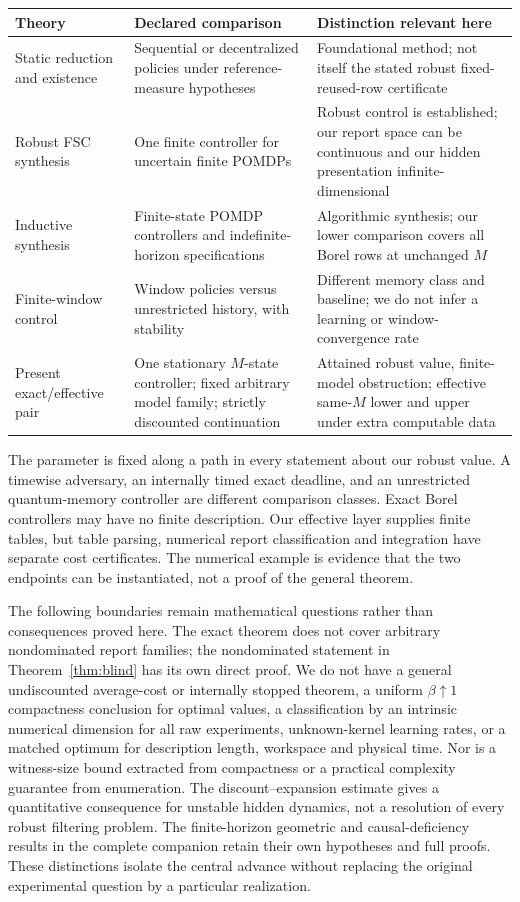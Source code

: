 \begin{center}\small
\begin{tabular}{p{.20\linewidth}p{.34\linewidth}p{.37\linewidth}}
\toprule
Theory & Declared comparison & Distinction relevant here\\\midrule
Static reduction and existence \cite{Witsenhausen,Yuksel} & Sequential or decentralized policies under reference-measure hypotheses & Foundational method; not itself the stated robust fixed-reused-row certificate\\[3pt]
Robust FSC synthesis \cite{Cubuktepe} & One finite controller for uncertain finite POMDPs & Robust control is established; our report space can be continuous and our hidden presentation infinite-dimensional\\[3pt]
Inductive synthesis \cite{Andriushchenko} & Finite-state POMDP controllers and indefinite-horizon specifications & Algorithmic synthesis; our lower comparison covers all Borel rows at unchanged $M$\\[3pt]
Finite-window control \cite{Kara} & Window policies versus unrestricted history, with stability & Different memory class and baseline; we do not infer a learning or window-convergence rate\\[3pt]
Present exact/effective pair & One stationary $M$-state controller; fixed arbitrary model family; strictly discounted continuation & Attained robust value, finite-model obstruction; effective same-$M$ lower and upper under extra computable data\\\bottomrule
\end{tabular}\end{center}
The parameter is fixed along a path in every statement about our robust value. A timewise adversary, an internally timed exact deadline, and an unrestricted quantum-memory controller are different comparison classes. Exact Borel controllers may have no finite description. Our effective layer supplies finite tables, but table parsing, numerical report classification and integration have separate cost certificates. The numerical example is evidence that the two endpoints can be instantiated, not a proof of the general theorem.

The following boundaries remain mathematical questions rather than consequences proved here. The exact theorem does not cover arbitrary nondominated report families; the nondominated statement in Theorem~\ref{thm:blind} has its own direct proof. We do not have a general undiscounted average-cost or internally stopped theorem, a uniform $\beta\uparrow1$ compactness conclusion for optimal values, a classification by an intrinsic numerical dimension for all raw experiments, unknown-kernel learning rates, or a matched optimum for description length, workspace and physical time. Nor is a witness-size bound extracted from compactness or a practical complexity guarantee from enumeration. The discount--expansion estimate gives a quantitative consequence for unstable hidden dynamics, not a resolution of every robust filtering problem. The finite-horizon geometric and causal-deficiency results in the complete companion retain their own hypotheses and full proofs. These distinctions isolate the central advance without replacing the original experimental question by a particular realization.
